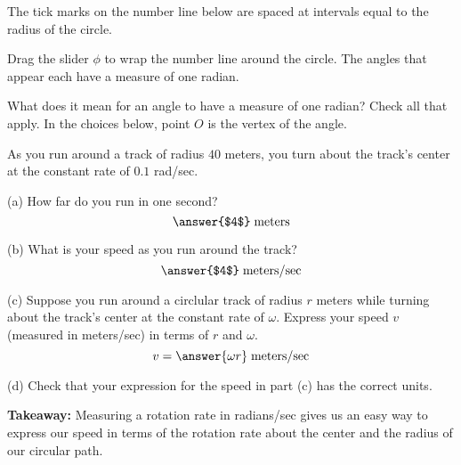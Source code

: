 \documentclass{ximera}
\begin{document}
\begin{exploration} \label{Esaghp:Cross}
The tick marks on the number line below are spaced at intervals equal to the radius of the circle.

Drag the slider $\phi$ to wrap the number line around the circle. The angles that appear each have a measure of one radian.

 
\begin{onlineOnly}
    \begin{center}
\end{center}
\end{onlineOnly}


\begin{question}   \label{Qsatd4th:Cross}
What does it mean for an angle to have a measure of one radian? Check all that apply. In the choices below, point $O$ is the vertex of the angle. 

\begin{selectAll}  
  \end{selectAll}  

\end{question}


\begin{question}  \label{Qt467743:Cross}
As you run around a track of radius $40$ meters, you turn about the track's center at the constant rate of $0.1$ rad/sec.

(a) How far do you run in one second?
\[
   \answer{$4$} \; \text{meters}
\]

(b) What is your speed as you run around the track?
\[
     \answer{$4$} \; \text{meters/sec} 
\]

(c) Suppose you run around a circlular track of radius $r$ meters while turning about the track's center at the constant rate of $\omega$. Express your speed $v$ (measured in meters/sec) in terms of $r$ and $\omega$.
\[
      v = \answer{\omega r} \; \text{meters/sec}
\]

(d) Check that your expression for the speed in part (c) has the correct units.


{\bf Takeaway:} Measuring a rotation rate in radians/sec gives us an easy way to express our speed in terms of the rotation rate about the center and the radius of our circular path.

\end{question}


\end{exploration}
\end{document}
